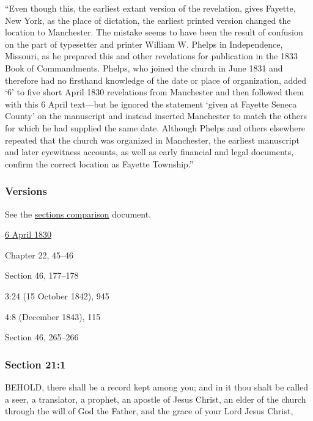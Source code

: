 			``Even though this, the earliest extant version of the revelation, gives Fayette, New York, as the place of dictation, the earliest printed version changed the location to Manchester. The mistake seems to have been the result of confusion on the part of typesetter and printer William W. Phelps in Independence, Missouri, as he prepared this and other revelations for publication in the 1833 Book of Commandments. Phelps, who joined the church in June 1831 and therefore had no firsthand knowledge of the date or place of organization, added `6' to five short April 1830 revelations from Manchester and then followed them with this 6 April text—but he ignored the statement `given at Fayette Seneca County' on the manuscript and instead inserted Manchester to match the others for which he had supplied the same date. Although Phelps and others elsewhere repeated that the church was organized in Manchester, the earliest manuscript and later eyewitness accounts, as well as early financial and legal documents, confirm the correct location as Fayette Township.''
			
	\subsubsection{Versions}
		\label{DC21-V}
		
		See the \href{https://drive.google.com/file/d/1goAvNz8jS4R8slYfMG_db55Ty2z_vmgK/view?usp=sharing}{sections comparison} document.
	
		\begin{compactdesc}
			\item[JSP] \hyperref[EMS-1830-JS-6-APR-1830]{6 April 1830}
			\item[BC] Chapter 22, 45--46
			\item[DC 1835] Section 46, 177--178
			\item[TS] 3:24 (15 October 1842), 945
			\item[MS] 4:8 (December 1843), 115
			\item[DC 1844] Section 46, 265--266
		\end{compactdesc}

	\subsubsection{Section 21:1} %
		\label{DC21-1}

		BEHOLD, there shall be a record kept among you; and in it thou shalt be called a seer, a translator, a prophet, an apostle of Jesus Christ, an elder of the church through the will of God the Father, and the grace of your Lord Jesus Christ,
		
